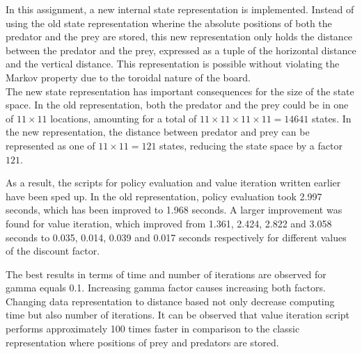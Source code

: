 In this assignment, a new internal state representation is implemented. Instead of using the old state representation wherine the absolute positions of both the predator and the prey are stored, this new representation only holds the distance between the predator and the prey, expressed as a tuple of the horizontal distance and the vertical distance. This representation is possible without violating the Markov property due to the toroidal nature of the board. \\

The new state representation has important consequences for the size of the state space. In the old representation, both the predator and the prey could be in one of $11 \times 11$ locations, amounting for a total of $11 \times 11 \times 11 \times 11 = 14641$ states. In the new representation, the distance between predator and prey can be represented as one of $11 \times 11 = 121$ states, reducing the state space by a factor $121$.

As a result, the scripts for policy evaluation and value iteration written earlier have been sped up. In the old representation, policy evaluation took 2.997 seconds, which has been improved to 1.968 seconds. A larger improvement was found for value iteration, which improved from 1.361, 2.424, 2.822 and 3.058 seconds to 0.035, 0.014, 0.039 and 0.017 seconds respectively for different values of the discount factor.

The best results in terms of time and number of iterations are observed for gamma equals 0.1. Increasing gamma factor causes increasing both factors. Changing data representation to distance based not only decrease computing time but also number of iterations. It can be observed that value iteration script performs approximately 100 times faster in comparison to the classic representation where positions of prey and predators are stored.
